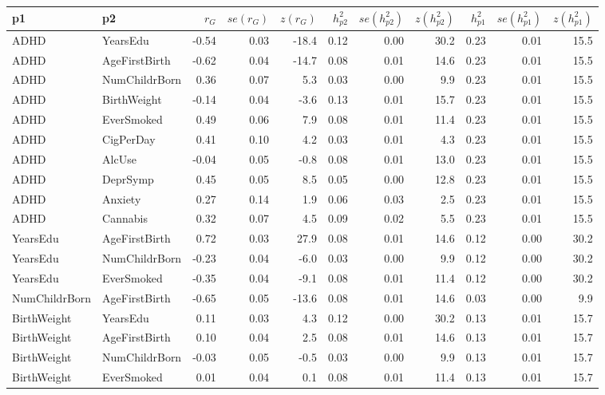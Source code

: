 \setlength\tabcolsep{3pt}
\begin{longtable}{llrrrrrrrrr}
  \hline
p1 & p2 & $r_G$ & $se(r_G)$ & $z(r_G)$ & $h^2_{p2}$ & $se(h^2_{p2})$ & $z(h^2_{p2})$ & $h^2_{p1}$ & $se(h^2_{p1})$ & $z(h^2_{p1})$ \\ 
  \hline
  \endhead
ADHD & YearsEdu & -0.54 & 0.03 & -18.4 & 0.12 & 0.00 & 30.2 & 0.23 & 0.01 & 15.5 \\ 
  ADHD & AgeFirstBirth & -0.62 & 0.04 & -14.7 & 0.08 & 0.01 & 14.6 & 0.23 & 0.01 & 15.5 \\ 
  ADHD & NumChildrBorn & 0.36 & 0.07 & 5.3 & 0.03 & 0.00 & 9.9 & 0.23 & 0.01 & 15.5 \\ 
  ADHD & BirthWeight & -0.14 & 0.04 & -3.6 & 0.13 & 0.01 & 15.7 & 0.23 & 0.01 & 15.5 \\ 
  ADHD & EverSmoked & 0.49 & 0.06 & 7.9 & 0.08 & 0.01 & 11.4 & 0.23 & 0.01 & 15.5 \\ 
  ADHD & CigPerDay & 0.41 & 0.10 & 4.2 & 0.03 & 0.01 & 4.3 & 0.23 & 0.01 & 15.5 \\ 
  ADHD & AlcUse & -0.04 & 0.05 & -0.8 & 0.08 & 0.01 & 13.0 & 0.23 & 0.01 & 15.5 \\ 
  ADHD & DeprSymp & 0.45 & 0.05 & 8.5 & 0.05 & 0.00 & 12.8 & 0.23 & 0.01 & 15.5 \\ 
  ADHD & Anxiety & 0.27 & 0.14 & 1.9 & 0.06 & 0.03 & 2.5 & 0.23 & 0.01 & 15.5 \\ 
  ADHD & Cannabis & 0.32 & 0.07 & 4.5 & 0.09 & 0.02 & 5.5 & 0.23 & 0.01 & 15.5 \\ 
  YearsEdu & AgeFirstBirth & 0.72 & 0.03 & 27.9 & 0.08 & 0.01 & 14.6 & 0.12 & 0.00 & 30.2 \\ 
  YearsEdu & NumChildrBorn & -0.23 & 0.04 & -6.0 & 0.03 & 0.00 & 9.9 & 0.12 & 0.00 & 30.2 \\ 
  YearsEdu & EverSmoked & -0.35 & 0.04 & -9.1 & 0.08 & 0.01 & 11.4 & 0.12 & 0.00 & 30.2 \\ 
  NumChildrBorn & AgeFirstBirth & -0.65 & 0.05 & -13.6 & 0.08 & 0.01 & 14.6 & 0.03 & 0.00 & 9.9 \\ 
  BirthWeight & YearsEdu & 0.11 & 0.03 & 4.3 & 0.12 & 0.00 & 30.2 & 0.13 & 0.01 & 15.7 \\ 
  BirthWeight & AgeFirstBirth & 0.10 & 0.04 & 2.5 & 0.08 & 0.01 & 14.6 & 0.13 & 0.01 & 15.7 \\ 
  BirthWeight & NumChildrBorn & -0.03 & 0.05 & -0.5 & 0.03 & 0.00 & 9.9 & 0.13 & 0.01 & 15.7 \\ 
  BirthWeight & EverSmoked & 0.01 & 0.04 & 0.1 & 0.08 & 0.01 & 11.4 & 0.13 & 0.01 & 15.7 \\ 

\end{longtable}
